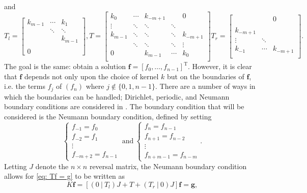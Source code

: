 \documentclass[12pt]{book}
\newcommand{\gVec}{\mathbf{g}}	%
\newcommand{\fVec}{\mathbf{f}}	%
\newcommand{\trans}{\mathrm{T}}	%
\begin{document}
and
\[T_{l} = \begin{bmatrix}
k_{m-1} & \cdots & k_{1} \\
 & \ddots & \ddots \\
 & & k_{m-1} \\
 & & \\
0 & & 
\end{bmatrix},
T = \begin{bmatrix}
k_{0} & \cdots & k_{-m+1} & & 0 \\
\vdots & \ddots & \ddots & \ddots &  \\
k_{m-1} & \ddots & \ddots & \ddots & k_{-m+1} \\
 & \ddots & \ddots & \ddots & \vdots \\
0 & & k_{m-1} & \cdots & k_{0} \\
\end{bmatrix}
T_{r} = \begin{bmatrix}
 & & 0 \\
 & & \\
k_{-m+1} & & \\
\vdots & \ddots &  \\
k_{-1} & \cdots & k_{-m+1} \\
\end{bmatrix}.\]
The goal is the same: obtain a solution $\fVec = [f_0,\ldots,f_{n-1}]^\trans$. However, it is clear that $\fVec$ depends not only upon the choice of kernel $k$ but on the boundaries of $\fVec$, i.e. the terms $f_j$ of $(f_n)$ where $j \not\in \{0,1,n-1\}$. There are a number of ways in which the boundaries can be handled; Dirichlet, periodic, and Neumann boundary conditions are considered in \cite{NeumannDCT}. The boundary condition that will be considered is the Neumann boundary condition, defined by setting
\[\begin{cases}
f_{-1} = f_0 \\
f_{-2} = f_1 \\
\vdots \\
f_{-m+2} = f_{n-1}
\end{cases} ~ \text{and} ~
\begin{cases}
f_{n} = f_{n-1} \\
f_{n+1} = f_{n-2} \\
\vdots \\
f_{n+m-1} = f_{n-m}
\end{cases}.\]
Letting $J$ denote the $n \times n$ reversal matrix, the Neumann boundary condition allows for \eqref{eq: Tf = g} to be written as
\begin{equation}
\label{eq:Neumann Kf = g}
K\fVec = [(0~|~T_{l})J + T + (T_{r}~|~0)J]\fVec = \gVec,
\end{equation}
\end{document}
